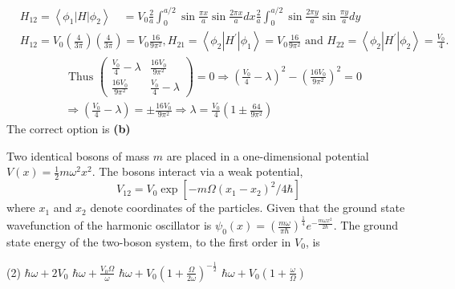 \begin{enumerate}
\begin{answer}
$$\begin{aligned}
	&H_{12}=\left\langle\phi_{1}|H| \phi_{2}\right\rangle \quad=V_{0} \frac{2}{a} \int_{0}^{a / 2} \sin \frac{\pi x}{a} \sin \frac{2 \pi x}{a} d x \frac{2}{a} \int_{0}^{a / 2} \sin \frac{2 \pi y}{a} \sin \frac{\pi y}{a} d y \\
	&H_{12}=V_{0}\left(\frac{4}{3 \pi}\right)\left(\frac{4}{3 \pi}\right)=V_{0} \frac{16}{9 \pi^{2}}, H_{21}=\left\langle\phi_{2}\left|H^{\prime}\right| \phi_{1}\right\rangle=V_{0} \frac{16}{9 \pi^{2}} \text { and } H_{22}=\left\langle\phi_{2}\left|H^{\prime}\right| \phi_{2}\right\rangle=\frac{V_{0}}{4} .
	\end{aligned}$$
	$$\begin{aligned}
	&\text { Thus }\left(\begin{array}{ll}
	\frac{V_{0}}{4}-\lambda & \frac{16 V_{0}}{9 \pi^{2}} \\
	\frac{16 V_{0}}{9 \pi^{2}} & \frac{V_{0}}{4}-\lambda
	\end{array}\right)=0 \Rightarrow\left(\frac{V_{0}}{4}-\lambda\right)^{2}-\left(\frac{16 V_{0}}{9 \pi^{2}}\right)^{2}=0 \\
	&\Rightarrow\left(\frac{V_{0}}{4}-\lambda\right)=\pm \frac{16 V_{0}}{9 \pi^{2}} \Rightarrow \lambda=\frac{V_{0}}{4}\left(1 \pm \frac{64}{9 \pi^{2}}\right)
	\end{aligned}$$
	The correct option is \textbf{(b)}
\end{answer}
\begin{minipage}{\textwidth}
	\item Two identical bosons of mass $m$ are placed in a one-dimensional potential $V(x)=\frac{1}{2} m \omega^{2} x^{2} .$ The bosons interact via a weak potential,
	$$
	V_{12}=V_{0} \exp \left[-m \Omega\left(x_{1}-x_{2}\right)^{2} / 4 \hbar\right]
	$$
	where $x_{1}$ and $x_{2}$ denote coordinates of the particles. Given that the ground state wavefunction of the harmonic oscillator is $\psi_{0}(x)=\left(\frac{m \omega}{\pi \hbar}\right)^{\frac{1}{4}} e^{-\frac{m \omega x^{2}}{2 \hbar}} .$ The ground state energy of the two-boson system, to the first order in $V_{0}$, is
\end{minipage}
\begin{tasks}(2)
	\task[\textbf{A.}] $\hbar \omega+2 V_{0}$
	\task[\textbf{B.}]$\hbar \omega+\frac{V_{0} \Omega}{\omega}$
	\task[\textbf{C.}]$\hbar \omega+V_{0}\left(1+\frac{\Omega}{2 \omega}\right)^{-\frac{1}{2}}$
	\task[\textbf{D.}]$\hbar \omega+V_{0}\left(1+\frac{\omega}{\Omega}\right)$
\end{tasks}
\begin{answer}

\end{answer}
\end{enumerate}
